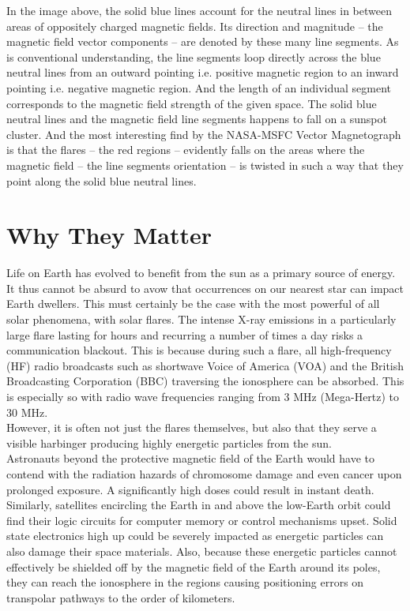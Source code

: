 \documentclass[12pt,twoside]{reedthesis}
\begin{document}
In the image above, the solid blue lines account for the neutral lines in between areas of oppositely charged magnetic fields. Its direction and magnitude – the magnetic field vector components – are denoted by these many line segments. As is conventional understanding, the line segments loop directly across the blue neutral lines from an outward pointing i.e. positive magnetic region to an inward pointing i.e. negative magnetic region. And the length of an individual segment corresponds to the magnetic field strength of the given space. The solid blue neutral lines and the magnetic field line segments happens to fall on a sunspot cluster. And the most interesting find by the NASA-MSFC Vector Magnetograph is that the flares – the red regions – evidently falls on the areas where the magnetic field – the line segments orientation – is twisted in such a way that they point along the solid blue neutral lines. \\

\section{Why They Matter} 

Life on Earth has evolved to benefit from the sun as a primary source of energy. It thus cannot be absurd to avow that occurrences on our nearest star can impact Earth dwellers. This must certainly be the case with the most powerful of all solar phenomena, with solar flares. The intense X-ray emissions in a particularly large flare lasting for hours and recurring a number of times a day risks a communication blackout. This is because during such a flare, all high-frequency (HF) radio broadcasts such as shortwave Voice of America (VOA) and the British Broadcasting Corporation (BBC) traversing the ionosphere can be absorbed. This is especially so with radio wave frequencies ranging from 3 MHz (Mega-Hertz) to 30 MHz.\\

However, it is often not just the flares themselves, but also that they serve a visible harbinger producing highly energetic particles from the sun. \\

Astronauts beyond the protective magnetic field of the Earth would have to contend with the radiation hazards of chromosome damage and even cancer upon prolonged exposure. A significantly high doses could result in instant death. Similarly, satellites encircling the Earth in and above the low-Earth orbit could find their logic circuits for computer memory or control mechanisms upset. Solid state electronics high up could be severely impacted as energetic particles can also damage their space materials. Also, because these energetic particles cannot effectively be shielded off by the magnetic field of the Earth around its poles, they can reach the ionosphere in the regions causing positioning errors on transpolar pathways to the order of kilometers.  \\
\end{document}
